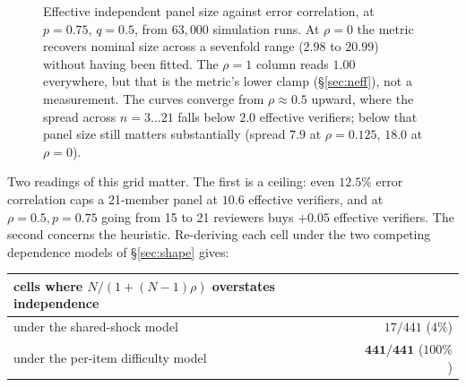 \documentclass[11pt,a4paper]{article}
\newcommand{\neff}{n_{\mathrm{eff}}}
\begin{document}
\begin{figure}[t]
\centering
{}
\caption{Effective independent panel size against error correlation, at
$p=0.75$, $q=0.5$, from $63{,}000$ simulation runs. At $\rho = 0$ the metric
recovers nominal size across a sevenfold range ($2.98$ to $20.99$) without having
been fitted. The $\rho = 1$ column reads $1.00$ everywhere, but that is the
metric's lower clamp (\S\ref{sec:neff}), not a measurement. The curves converge
from $\rho \approx 0.5$ upward, where the spread across $n = 3 \dots 21$ falls
below $2.0$ effective verifiers; below that panel size still matters
substantially (spread $7.9$ at $\rho = 0.125$, $18.0$ at $\rho = 0$).}
\label{fig:neff}
\end{figure}

Two readings of this grid matter. The first is a ceiling: even $12.5\%$ error
correlation caps a 21-member panel at $10.6$ effective verifiers, and at
$\rho = 0.5, p = 0.75$ going from 15 to 21 reviewers buys $+0.05$ effective
verifiers. The second concerns the heuristic. Re-deriving each cell under the two
competing dependence models of \S\ref{sec:shape} gives:

\begin{center}
\begin{tabular}{lr}
\toprule
cells where $N/(1+(N-1)\rho)$ overstates independence & \\
\midrule
under the shared-shock model & $17/441$ \; ($4\%$) \\
under the per-item difficulty model & $\mathbf{441/441}$ \; ($100\%$) \\
\bottomrule
\end{tabular}
\end{center}
\end{document}
